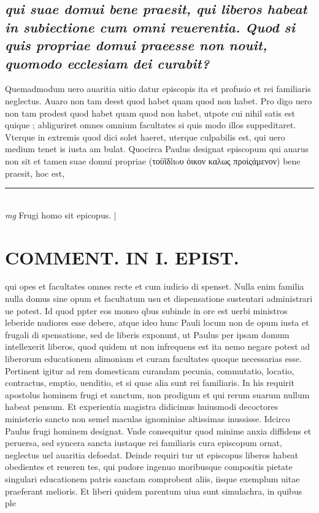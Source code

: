 \documentclass{article}
\begin{document}
\begin{pages}
\subsection*{\textit{qui suae domui bene praesit, qui liberos habeat in subiectione cum omni reuerentia. Quod si quis propriae domui praeesse non nouit, quomodo ecclesiam dei curabit? }}\pstart Quemadmodum uero auaritia uitio datur episcopis ita et profusio et rei familiaris neglectus. Auaro non tam deest quod habet quam quod non habet. Pro digo uero non tam prodest quod habet quam quod non habet, utpote cui nihil satis est quique ; abliguriret omnes omnium facultates si quis modo illos suppeditaret. Vterque in extremis quod dici solet haeret, uterque culpabilis est, qui uero medium tenet is iusta am bulat. Quocirca Paulus designat episcopum qui auarus non sit et tamen suae domui propriae (τοϋἴδlιoυ ὁικον καλως προίςάμενον) bene praesit, hoc est,  \pend
\vspace{0.5cm}\noindent
\vspace{0.2cm}\rule{1cm}{0.2pt}\\ 
\hspace{0.2cm}\textit{mg}
\footnotesize Frugi homo sit epicopus. 
\normalsize| 
\section*{COMMENT. IN I. EPIST. }\pstart qui opes et facultates omnes recte et cum iudicio di spenset. Nulla enim familia nulla domus sine opum et facultatum usu et dispensatione sustentari administrari ue potest. Id quod ppter eos moneo qbus subinde in ore est uerbi ministros leberide nudiores esse debere, atque ideo hunc Pauli locum non de opum iusta et frugali di spensatione, sed de liberis exponunt, ut Paulus per ipsam domum intellexerit liberos, quod quidem ut non infrequens est ita nemo negare potest ad liberorum educationem alimoniam et curam facultates quoque necessarias esse. Pertinent igitur ad rem domesticam curandam pecunia, commutatio, locatio, contractus, emptio, uenditio, et si quae alia sunt rei familiaris. In his requirit apostolus hominem frugi et sanctum, non prodigum et qui rerum suarum nullum habeat pensum. Et experientia magistra didicimus huiusmodi decoctores ministerio sancto non semel maculas ignominiae altissimas inussisse. Idcirco Paulus frugi hominem designat. Vnde consequitur quod minime anxia diffidens et peruersa, sed syncera sancta iustaque rei familiaris cura episcopum ornat, neglectus uel auaritia defoedat. Deinde requiri tur ut episcopus liberos habeat obedientes et reueren tes, qui pudore ingenuo moribusque compositis pietate singulari educationem patris sanctam comprobent aliis, iisque exemplum uitae praeferant melioris. Et liberi quidem parentum uiua sunt simulachra, in quibus ple\pend

\end{pages}
\end{document}

